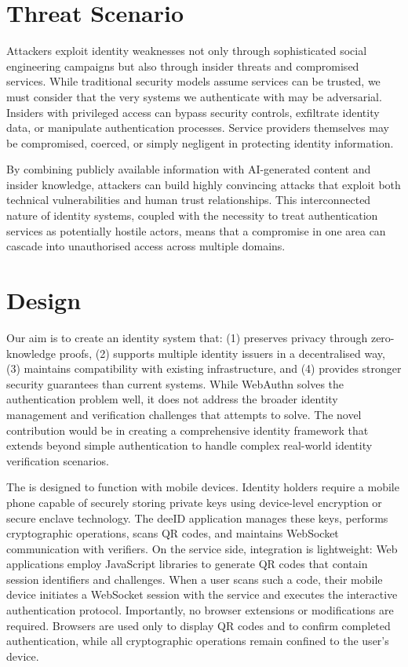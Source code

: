 %

\section{Threat Scenario}
\label{sec::chp6::threat_scenario}

Attackers exploit identity weaknesses not only through sophisticated social engineering campaigns but also through insider threats and compromised services. While traditional security models assume services can be trusted, we must consider that the very systems we authenticate with may be adversarial. Insiders with privileged access can bypass security controls, exfiltrate identity data, or manipulate authentication processes. Service providers themselves may be compromised, coerced, or simply negligent in protecting identity information.

By combining publicly available information with AI-generated content and insider knowledge, attackers can build highly convincing attacks that exploit both technical vulnerabilities and human trust relationships. This interconnected nature of identity systems, coupled with the necessity to treat authentication services as potentially hostile actors, means that a compromise in one area can cascade into unauthorised access across multiple domains.

\section{Design}
\label{sec::chp6::design}

Our aim is to create an identity system that: (1) preserves privacy through zero-knowledge proofs, (2) supports multiple identity issuers in a decentralised way, (3) maintains compatibility with existing infrastructure, and (4) provides stronger security guarantees than current systems. While WebAuthn solves the authentication problem well, it does not address the broader identity management and verification challenges that \deeid attempts to solve. The novel contribution would be in creating a comprehensive identity framework that extends beyond simple authentication to handle complex real-world identity verification scenarios.

The \deeid is designed to function with mobile devices. Identity holders require a mobile phone capable of securely storing private keys using device-level encryption or secure enclave technology. The deeID application manages these keys, performs cryptographic operations, scans QR codes, and maintains WebSocket communication with verifiers. On the service side, integration is lightweight: Web applications employ JavaScript libraries to generate QR codes that contain session identifiers and challenges. When a user scans such a code, their mobile device initiates a WebSocket session with the service and executes the interactive authentication protocol. Importantly, no browser extensions or modifications are required. Browsers are used only to display QR codes and to confirm completed authentication, while all cryptographic operations remain confined to the user's device.

